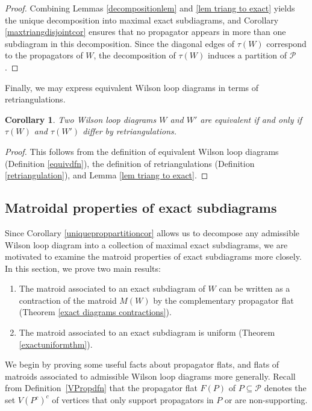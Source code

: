 \documentclass[11pt]{article}
\newcommand{\cP}{\mathcal{P}}
\newtheorem{cor}[thm]{Corollary}
\theoremstyle{remark}
\theoremstyle{definition}
\begin{document}
\begin{proof}
Combining Lemmas \ref{decompositionlem} and \ref{lem triang to exact} yields the unique decomposition into maximal exact subdiagrams, and Corollary \ref{maxtriangdisjointcor} ensures that no propagator appears in more than one subdiagram in this decomposition. Since the diagonal edges of $\tau(W)$ correspond to the propagators of $W$, the decomposition of $\tau(W)$ induces a partition of $\cP$.
\end{proof}

Finally, we may express equivalent Wilson loop diagrams in terms of retriangulations.

\begin{cor}\label{equialentretriangulation}
Two Wilson loop diagrams $W$ and $W'$ are equivalent if and only if $\tau(W)$ and $\tau(W')$ differ by retriangulations.
\end{cor}

\begin{proof}
This follows from the definition of equivalent Wilson loop diagrams (Definition \ref{equivdfn}), the definition of retriangulations (Definition \ref{retriangulation}), and Lemma \ref{lem triang to exact}.
\end{proof}



\subsection{Matroidal properties of exact subdiagrams \label{sec: exact diagram matroidal props}}

Since Corollary \ref{uniqueproppartitioncor} allows us to decompose any admissible Wilson loop diagram into a collection of maximal exact subdiagrams, we are motivated to examine the matroid properties of exact subdiagrams more closely. In this section, we prove two main results:
\begin{enumerate}
\item The matroid associated to an exact subdiagram of $W$ can be written as a contraction of the matroid $M(W)$ by the complementary propagator flat (Theorem \ref{exact diagrams contractions}). 
\item The matroid associated to an exact subdiagram is uniform (Theorem \ref{exactuniformthm}).
\end{enumerate}

We begin by proving some useful facts about propagator flats, and flats of matroids associated to admissible Wilson loop diagrams more generally. Recall from Definition~\ref{VPropdfn} that the propagator flat $F(P)$ of $P \subseteq \cP$ denotes the set $V(P^c)^c$ of vertices that only support propagators in $P$ or are non-supporting.
\end{document}

